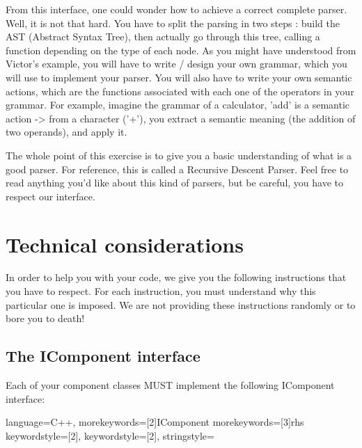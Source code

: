 \documentclass{koala-en}
\begin{document}
    From this interface, one could wonder how to achieve a correct complete parser. Well, it is not that hard.
  You have to split the parsing in two steps : build the AST (Abstract Syntax Tree), then actually go through this tree, calling
  a function depending on the type of each node.
  As you might have understood from Victor's example, you will have to write / design your own grammar, which you will use to implement your parser.
  You will also have to write your own semantic actions, which are the functions associated with each one of the operators in your grammar. For example,
  imagine the grammar of a calculator, 'add' is a semantic action -> from a character ('+'), you extract a semantic meaning (the addition of two operands),
  and apply it.

  \hint
      {
          The whole point of this exercise is to give you a basic understanding of what is a good parser. For reference, this is called a Recursive Descent Parser.
        Feel free to read anything you'd like about this kind of parsers, but be careful, you have to respect our interface.
      }


\chapter{Technical considerations}

    In order to help you with your code, we give you the following instructions that 
  you have to respect. For each instruction, you must understand why this particular
  one is imposed. We are not providing these instructions randomly or to bore you to 
  death!

\section{The IComponent interface}

     Each of your component classes MUST implement the following IComponent interface:

  \lstset
      {
        language=C++,
        morekeywords=[2]{IComponent}
        morekeywords=[3]{rhs}
        keywordstyle=[2]\color{nicergreen}\ttfamily,
        keywordstyle=[2]\color{nicerorange}\ttfamily,
        stringstyle=\color{nicergreen}\ttfamily
      }
    
\end{document}
